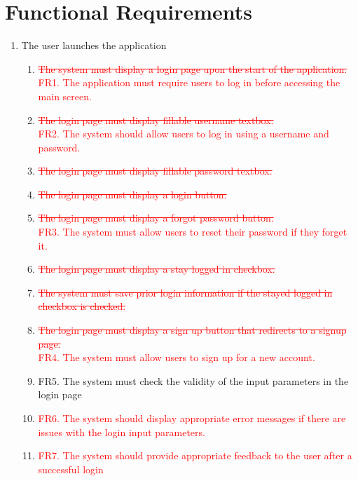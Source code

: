 \documentclass[12pt,letterpaper]{article}
\begin{document}
\section{Functional Requirements}
\begin{enumerate}[{BE}1.] 
	\item The user launches the application
	\begin{enumerate}[1.]
\item {\textcolor{red}{\sout{The system must display a login page upon the start of the application.}}} \\
{\textcolor{red}{FR1. The application must require users to log in before accessing the main screen.}}
\item {\textcolor{red}{\sout{The login page must display fillable username textbox.}}} \\
{\textcolor{red}{FR2. The system should allow users to log in using a username and password.}}
\item {\textcolor{red}{\sout{The login page must display fillable password textbox.}}} 
\item {\textcolor{red}{\sout{The login page must display a login button.}}} 
\item {\textcolor{red}{\sout{The login page must display a forgot password button.}}} \\
{\textcolor{red}{FR3. The system must allow users to reset their password if they forget it.}}
\item {\textcolor{red}{\sout{The login page must display a stay logged in checkbox.}}} 
\item {\textcolor{red}{\sout{The system must save prior login information if the stayed logged in checkbox is checked.}}} 
\item {\textcolor{red}{\sout{The login page must display a sign up button that redirects to a signup page.}}} \\
{\textcolor{red}{FR4. The system must allow users to sign up for a new account.}}
\item FR5. The system must check the validity of the input parameters in the login page
\item {\textcolor{red}{FR6. The system should display appropriate error messages if there are issues with the login input parameters.}}
\item {\textcolor{red}{FR7. The system should provide appropriate feedback to the user after a successful login}}
	\end{enumerate}
	

\end{enumerate}
\end{document}
